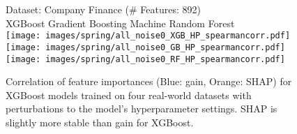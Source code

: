 \begin{figure}[h]
    Dataset: Company Finance (\# Features: 892)\\
     XGBoost  \hspace{1.7cm} Gradient Boosting Machine \hspace{1cm} Random Forest \\ 
    \texttt{[image: images/spring/all\_noise0\_XGB\_HP\_spearmancorr.pdf]}
    \texttt{[image: images/spring/all\_noise0\_GB\_HP\_spearmancorr.pdf]}
    \texttt{[image: images/spring/all\_noise0\_RF\_HP\_spearmancorr.pdf]}
    
    \caption{Correlation of feature importances (Blue: gain, Orange: SHAP) for XGBoost models trained on four real-world datasets with perturbations to the model's hyperparameter settings. SHAP is slightly more stable than gain for XGBoost.}
    \label{fig:real_world_diff_seed}
\end{figure}

  
